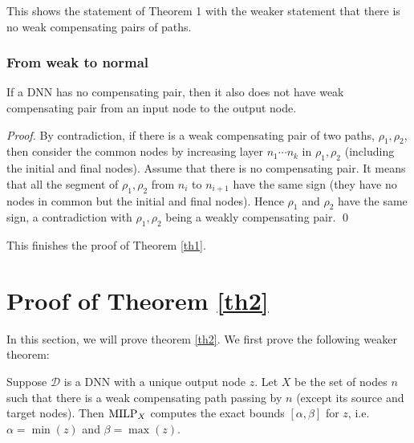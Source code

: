 This shows the statement of Theorem 1 with the weaker statement that there is no weak compensating pairs of paths.

	
	
	\subsubsection*{From weak to normal}
	
	\begin{lemma}
		If a DNN has no compensating pair, then it also does not have weak compensating pair from an input node to the output node.
	\end{lemma}
	
	\begin{proof}
		By contradiction, if there is a weak compensating pair of two paths, $\rho_1,\rho_2$, 
		then consider the common nodes by increasing layer $n_1 \cdots n_k$ in $\rho_1,\rho_2$ (including the initial and final nodes).
		Assume that there is no compensating pair.
		It means that all the segment of $\rho_1,\rho_2$ from $n_i$ to $n_{i+1}$ have the same sign (they have no nodes in common but the initial and final nodes).
		Hence $\rho_1$ and $\rho_2$ have the same sign, a contradiction with $\rho_1,\rho_2$ being a weakly compensating pair.  \qed
	\end{proof}
	
	This finishes the proof of Theorem \ref{th1}.
	
	












	\newpage

	





			
\section{Proof of Theorem \ref{th2}}
			
			In this section, we will prove theorem \ref{th2}. We first prove the following weaker theorem:
			
			\begin{theorem} \label{thm:2}
				
				
				Suppose $\mathcal{D}$ is a DNN with a unique output node $z$.
				Let $X$ be the set of nodes $n$ such that there is a weak compensating path 
				passing by $n$ (except its source and target nodes).
				Then ${\textrm{MILP}}_X$ computes the exact bounds $[\alpha,\beta]$ for $z$,
				i.e. $\alpha=\min(z)$ and $\beta=\max(z)$.
			\end{theorem}
			
